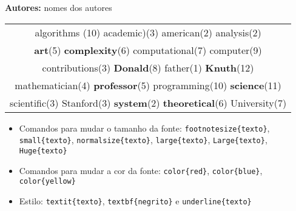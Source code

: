 \documentclass[12pt,a4paper]{article}
\begin{document}
\begin{center}
{\bf Autores:} {\sc nomes dos autores} \\
\vspace*{0.3cm}


\end{center}


\begin{center}
\begin{tabular}{|c|}
\hline 
{\Huge {algorithms}} \footnotesize{(10)} {\normalsize{academic)}}\footnotesize{(3)} {\small{american}}\footnotesize{(2)} {\footnotesize{analysis}}\footnotesize{(2)} \\
\textbf{\large{art}}\footnotesize{(5)} \textbf{\Large{complexity}}\footnotesize{(6)} {\Large{computational}}\footnotesize{(7)} {\Huge{computer}}\footnotesize{(9)}  \\
{\small{contributions}}\footnotesize{(3)} \textbf{\Huge{Donald}}\footnotesize{(8)} \footnotesize{father}\footnotesize{(1)} {\textbf{\Huge{Knuth}}}\footnotesize{(12)}\\ {\normalsize{mathematician}}\footnotesize{(4)}  {\textbf{\small{professor}}}\footnotesize{(5)} {\Huge{programming}}\footnotesize{(10)} {\textbf{\huge{science}}}\footnotesize{(11)} \\
{ \small{scientific}}\footnotesize{(3)} {\normalsize{Stanford}}\footnotesize{(3)} {\textbf{\small{system}}}\footnotesize{(2)} \textbf{\large{theoretical}}\footnotesize{(6)} {\Large{University}}\footnotesize{(7)}\\
 \hline
 \end{tabular}
\end{center}


\begin{itemize}
\item Comandos para mudar o tamanho da fonte: \texttt{footnotesize\{texto\}}, \texttt{small\{texto\}}, \texttt{normalsize\{texto\}}, \texttt{large\{texto\}}, \texttt{Large\{texto\}}, \texttt{Huge\{texto\}}

\item Comandos para mudar a cor da fonte: \texttt{color\{red\}}, \texttt{color\{blue\}}, \texttt{color\{yellow\}}

\item Estilo: \texttt{textit\{texto\}}, \texttt{textbf\{negrito\}} e \texttt{underline\{texto\}}

\end{itemize}
\end{document}
